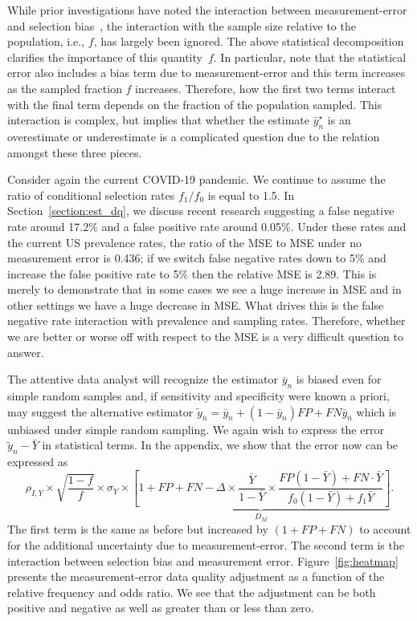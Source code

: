 \documentclass[aoas]{amsart}
\begin{document}
While prior investigations have noted the interaction between measurement-error and selection bias~\citep{Beesley2020,Beesley2019,Smeden2019}, the interaction with the sample size relative to the population, i.e., $f$, has largely been ignored.  The above statistical decomposition clarifies the importance of this quantity~$f$.  In particular, note that the statistical error also includes a bias term due to measurement-error and this term increases as the sampled fraction $f$ increases. Therefore, how the first two terms interact with the final term depends on the fraction of the population sampled.  This interaction is complex, but implies that whether the estimate $\bar y^\star_n$ is an overestimate or underestimate is a complicated question due to the relation amongst these three pieces.

Consider again the current COVID-19 pandemic. We continue to assume the ratio of conditional selection rates $f_1/f_0$ is equal to 1.5.  In Section~\ref{section:est_dq}, we discuss recent research suggesting a false negative rate around 17.2\% and a false positive rate around 0.05\%. Under these rates and the current US prevalence rates, the ratio of the MSE to MSE under no measurement error is 0.436; if we switch false negative rates down to 5\% and increase the false positive rate to 5\% then the relative MSE is 2.89.  This is merely to demonstrate that in some cases we see a huge increase in MSE and in other settings we have a huge decrease in MSE.  What drives this is the false negative rate interaction with prevalence and sampling rates.  Therefore, whether we are better or worse off with respect to the MSE is a very difficult question to answer.


The attentive data analyst will recognize the estimator $\bar y_n$ is biased even for simple random samples and, if sensitivity and specificity were known a priori, may suggest the alternative estimator $\tilde y_n = \bar y_n + (1-\bar y_n) FP + FN \bar y_n$ which is unbiased under simple random sampling. We again wish to express the error $\tilde  y_n - \bar Y$ in statistical terms. In the appendix, we show that the error now can be expressed as
\begin{equation}
\label{eq:error}
\rho_{I,Y} \times \sqrt{\frac{1-f}{f}} \times \sigma_{Y}
\times \underbrace{\left[ 1 + FP + FN - \Delta \times \frac{\bar Y}{1-\bar Y} \times \frac{FP(1-\bar Y) + FN \cdot \bar Y}{f_0 (1-\bar Y) + f_1 \bar Y} \right]}_{D_M}.
\end{equation}
The first term is the same as before but increased by $(1 + FP + FN)$ to account for the additional uncertainty due to measurement-error.  The second term is the interaction between selection bias and measurement error.  Figure~\ref{fig:heatmap} presents the measurement-error data quality adjustment as a function of the relative frequency and odds ratio.  We see that the adjustment can be both positive and negative as well as greater than or less than zero.
\end{document}
